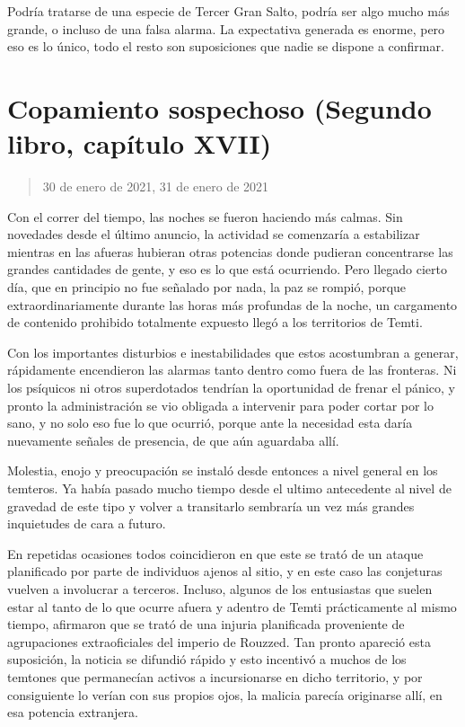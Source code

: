 \documentclass[
]{book}
\begin{document}
Podría tratarse de una especie de Tercer Gran Salto, podría ser algo mucho más grande, o incluso de una falsa alarma. La expectativa generada es enorme, pero eso es lo único, todo el resto son suposiciones que nadie se dispone a confirmar.

\hypertarget{copamiento-sospechoso-segundo-libro-capuxedtulo-xvii}{%
\section{Copamiento sospechoso (Segundo libro, capítulo XVII)}\label{copamiento-sospechoso-segundo-libro-capuxedtulo-xvii}}

\begin{quote}
30 de enero de 2021, 31 de enero de 2021
\end{quote}

Con el correr del tiempo, las noches se fueron haciendo más calmas. Sin novedades desde el último anuncio, la actividad se comenzaría a estabilizar mientras en las afueras hubieran otras potencias donde pudieran concentrarse las grandes cantidades de gente, y eso es lo que está ocurriendo. Pero llegado cierto día, que en principio no fue señalado por nada, la paz se rompió, porque extraordinariamente durante las horas más profundas de la noche, un cargamento de contenido prohibido totalmente expuesto llegó a los territorios de Temti.

Con los importantes disturbios e inestabilidades que estos acostumbran a generar, rápidamente encendieron las alarmas tanto dentro como fuera de las fronteras. Ni los psíquicos ni otros superdotados tendrían la oportunidad de frenar el pánico, y pronto la administración se vio obligada a intervenir para poder cortar por lo sano, y no solo eso fue lo que ocurrió, porque ante la necesidad esta daría nuevamente señales de presencia, de que aún aguardaba allí.

Molestia, enojo y preocupación se instaló desde entonces a nivel general en los temteros. Ya había pasado mucho tiempo desde el ultimo antecedente al nivel de gravedad de este tipo y volver a transitarlo sembraría un vez más grandes inquietudes de cara a futuro.

En repetidas ocasiones todos coincidieron en que este se trató de un ataque planificado por parte de individuos ajenos al sitio, y en este caso las conjeturas vuelven a involucrar a terceros. Incluso, algunos de los entusiastas que suelen estar al tanto de lo que ocurre afuera y adentro de Temti prácticamente al mismo tiempo, afirmaron que se trató de una injuria planificada proveniente de agrupaciones extraoficiales del imperio de Rouzzed. Tan pronto apareció esta suposición, la noticia se difundió rápido y esto incentivó a muchos de los temtones que permanecían activos a incursionarse en dicho territorio, y por consiguiente lo verían con sus propios ojos, la malicia parecía originarse allí, en esa potencia extranjera.
\end{document}
